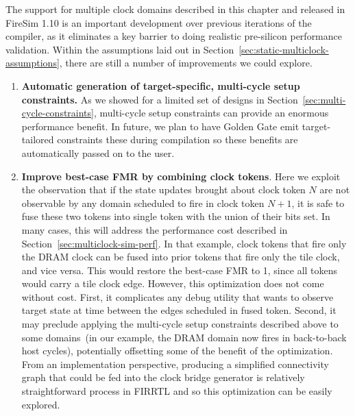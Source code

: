 The support for multiple clock domains described in this chapter and released
in FireSim 1.10 is an important development over previous iterations of the
compiler, as it eliminates a key barrier to doing realistic pre-silicon
performance validation.  Within the assumptions laid out in
Section~\ref{sec:static-multiclock-assumptions}, there are still a number of
improvements we could explore.

\begin{enumerate}
    \item  \textbf{Automatic generation of target-specific, multi-cycle setup constraints.} As we
showed for a limited set of designs in
Section~\ref{sec:multi-cycle-constraints}, multi-cycle setup constraints can
provide an enormous performance benefit. In future, we plan to have Golden Gate emit target-tailored
constraints these during compilation so these benefits are automatically passed
on to the user.

\item \textbf{Improve best-case FMR by combining clock tokens}. Here we exploit the observation that if the state
updates brought about clock token $N$ are not observable by any domain
scheduled to fire in clock token $N+1$, it is safe to fuse these two tokens
into single token with the union of their bits set. In many cases, this will
address the performance cost described in
Section~\ref{sec:multiclock-sim-perf}. In that example, clock tokens that fire
only the DRAM clock can be fused into prior tokens that fire only the tile clock,
and vice versa. This would restore the best-case FMR to 1, since all
tokens would carry a tile clock edge. However, this optimization does not come without cost. First, it complicates any debug utility that wants to observe target
state at time between the edges scheduled in fused token. Second, it may
preclude applying the multi-cycle setup constraints described above to some
domains~(in our example, the DRAM domain now fires in back-to-back host cycles),
potentially offsetting some of the benefit of the optimization. From an
implementation perspective, producing a simplified connectivity graph that
could be fed into the clock bridge generator is relatively straightforward
process in FIRRTL and so this optimization can be easily explored.


\end{enumerate}
